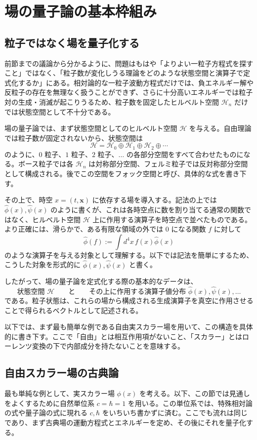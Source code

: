 \section{場の量子論の基本枠組み}

\subsection{粒子ではなく場を量子化する}
前節までの議論から分かるように、問題はもはや「よりよい一粒子方程式を探すこと」ではなく、「粒子数が変化しうる理論をどのような状態空間と演算子で定式化するか」にある。相対論的な一粒子波動方程式だけでは、負エネルギー解や反粒子の存在を無理なく扱うことができず、さらに十分高いエネルギーでは粒子対の生成・消滅が起こりうるため、粒子数を固定したヒルベルト空間 $\mathcal{H}_n$ だけでは状態空間として不十分である。

場の量子論では、まず状態空間としてのヒルベルト空間 $\mathcal{H}$ を与える。自由理論では粒子数が固定されないから、状態空間は
\[
\mathcal{H}=\mathcal{H}_0\oplus \mathcal{H}_1\oplus \mathcal{H}_2\oplus\cdots
\]
のように、$0$ 粒子、$1$ 粒子、$2$ 粒子、$\dots$ の各部分空間をすべて合わせたものになる。ボース粒子では各 $\mathcal{H}_n$ は対称部分空間、フェルミ粒子では反対称部分空間として構成される。後でこの空間をフォック空間と呼び、具体的な式を書き下す。

その上で、時空 $x=(t,\mathbf{x})$ に依存する場を導入する。記法の上では $\hat{\phi}(x), \hat{\psi}(x)$ のように書くが、これは各時空点に数を割り当てる通常の関数ではなく、ヒルベルト空間 $\mathcal{H}$ 上に作用する演算子を時空点で並べたものである。より正確には、滑らかで、ある有限な領域の外では $0$ になる関数 $f$ に対して
\[
\hat{\phi}(f) := \int d^4x\, f(x)\hat{\phi}(x)
\]
のような演算子を与える対象として理解する。以下では記法を簡単にするため、こうした対象を形式的に $\hat{\phi}(x),\hat{\psi}(x)$ と書く。

したがって、場の量子論を定式化する際の基本的なデータは、
\[
\text{状態空間 } \mathcal{H}
\qquad \text{と} \qquad
\text{その上に作用する演算子値分布 } \hat{\phi}(x), \hat{\psi}(x), \dots
\]
である。粒子状態は、これらの場から構成される生成演算子を真空に作用させることで得られるベクトルとして記述される。

以下では、まず最も簡単な例である自由実スカラー場を用いて、この構造を具体的に書き下す。ここで「自由」とは相互作用項がないこと、「スカラー」とはローレンツ変換の下で内部成分を持たないことを意味する。

\subsection{自由スカラー場の古典論}
最も単純な例として、実スカラー場 $\phi(x)$ を考える。以下、この節では見通しをよくするために自然単位系 $c=\hbar=1$ を用いる。この単位系では、特殊相対論の式や量子論の式に現れる $c,\hbar$ をいちいち書かずに済む。ここでも流れは同じであり、まず古典場の運動方程式とエネルギーを定め、その後にそれを量子化する。

